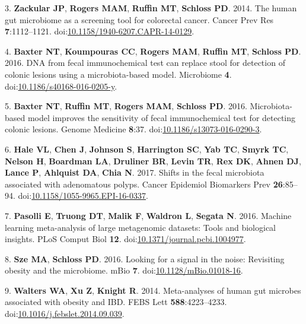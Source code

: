 \documentclass[11pt,]{article}
\begin{document}
\hypertarget{ref-zackular_human_2014}{}
3. \textbf{Zackular JP}, \textbf{Rogers MAM}, \textbf{Ruffin MT},
\textbf{Schloss PD}. 2014. The human gut microbiome as a screening tool
for colorectal cancer. Cancer Prev Res \textbf{7}:1112--1121.
doi:\href{https://doi.org/10.1158/1940-6207.CAPR-14-0129}{10.1158/1940-6207.CAPR-14-0129}.

\hypertarget{ref-baxter_dna_2016}{}
4. \textbf{Baxter NT}, \textbf{Koumpouras CC}, \textbf{Rogers MAM},
\textbf{Ruffin MT}, \textbf{Schloss PD}. 2016. DNA from fecal
immunochemical test can replace stool for detection of colonic lesions
using a microbiota-based model. Microbiome \textbf{4}.
doi:\href{https://doi.org/10.1186/s40168-016-0205-y}{10.1186/s40168-016-0205-y}.

\hypertarget{ref-baxter_microbiota-based_2016}{}
5. \textbf{Baxter NT}, \textbf{Ruffin MT}, \textbf{Rogers MAM},
\textbf{Schloss PD}. 2016. Microbiota-based model improves the
sensitivity of fecal immunochemical test for detecting colonic lesions.
Genome Medicine \textbf{8}:37.
doi:\href{https://doi.org/10.1186/s13073-016-0290-3}{10.1186/s13073-016-0290-3}.

\hypertarget{ref-hale_shifts_2017}{}
6. \textbf{Hale VL}, \textbf{Chen J}, \textbf{Johnson S},
\textbf{Harrington SC}, \textbf{Yab TC}, \textbf{Smyrk TC},
\textbf{Nelson H}, \textbf{Boardman LA}, \textbf{Druliner BR},
\textbf{Levin TR}, \textbf{Rex DK}, \textbf{Ahnen DJ}, \textbf{Lance P},
\textbf{Ahlquist DA}, \textbf{Chia N}. 2017. Shifts in the fecal
microbiota associated with adenomatous polyps. Cancer Epidemiol
Biomarkers Prev \textbf{26}:85--94.
doi:\href{https://doi.org/10.1158/1055-9965.EPI-16-0337}{10.1158/1055-9965.EPI-16-0337}.

\hypertarget{ref-pasolli_machine_2016}{}
7. \textbf{Pasolli E}, \textbf{Truong DT}, \textbf{Malik F},
\textbf{Waldron L}, \textbf{Segata N}. 2016. Machine learning
meta-analysis of large metagenomic datasets: Tools and biological
insights. PLoS Comput Biol \textbf{12}.
doi:\href{https://doi.org/10.1371/journal.pcbi.1004977}{10.1371/journal.pcbi.1004977}.

\hypertarget{ref-sze_looking_2016}{}
8. \textbf{Sze MA}, \textbf{Schloss PD}. 2016. Looking for a signal in
the noise: Revisiting obesity and the microbiome. mBio \textbf{7}.
doi:\href{https://doi.org/10.1128/mBio.01018-16}{10.1128/mBio.01018-16}.

\hypertarget{ref-walters_meta-analyses_2014}{}
9. \textbf{Walters WA}, \textbf{Xu Z}, \textbf{Knight R}. 2014.
Meta-analyses of human gut microbes associated with obesity and IBD.
FEBS Lett \textbf{588}:4223--4233.
doi:\href{https://doi.org/10.1016/j.febslet.2014.09.039}{10.1016/j.febslet.2014.09.039}.
\end{document}
